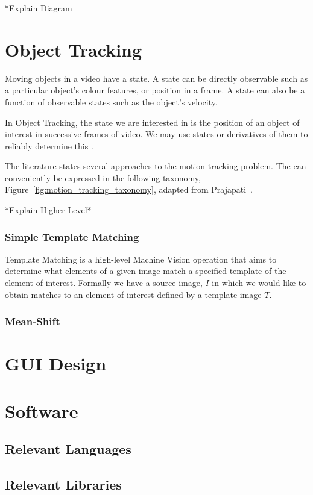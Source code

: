 *Explain Diagram

\section{Object Tracking}
Moving objects in a video have a state. A state can be directly observable such as a
particular object's colour features, or position in a frame. A state can also be a function
of observable states such as the object's velocity.

In Object Tracking, the state we are interested in is the position of an object
of interest in successive frames of video. We may use states or derivatives of
them to reliably determine this \cite{Forsyth2012}.

The literature states several approaches to the motion tracking problem. The can
conveniently be expressed in the following taxonomy, Figure~\ref{fig:motion_tracking_taxonomy},
adapted from Prajapati~\cite{Prajapati2015}.


*Explain Higher Level*

\subsubsection{Simple Template Matching}
Template Matching is a high-level Machine Vision operation that aims to determine
what elements of a given image match a specified template of the element of
interest.
Formally we have a source image, $I$ in which we would like to obtain matches to
an element of interest defined by a template image $T$.

\subsubsection{Mean-Shift}\label{literature_review_mean_shift}


\section{GUI Design}

\section{Software}

\subsection{Relevant Languages}

\subsection{Relevant Libraries}




